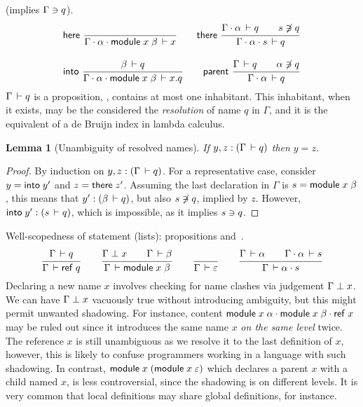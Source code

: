 \documentclass{article}
\theoremstyle{definition}
\theoremstyle{plain}
\newtheorem{lemma}{Lemma}
\theoremstyle{remark}
\begin{document}
 (implies $\Gamma\ni q$).
\begin{gather*}
  \nru{\rhere
     }{
     }{\Declares {\Gamma \sep \alpha \sep \mdef x \beta} x}
\qquad
   \nru{\rthere
      }{\Declares {\Gamma \sep \alpha} q \qquad \NotContains s q
      }{\Declares {\Gamma \sep \alpha \sep s} q}
\\[2ex]
  \nru{\rinto
     }{\Declares \beta q
     }{\Declares {\Gamma \sep \alpha \sep \mdef x \beta} {x.q}}
\qquad
   \nru{\rparent
      }{\Declares {\Gamma} q \qquad \NotContains \alpha q
      }{\Declares {\Gamma \sep \alpha} q}
\end{gather*}
$\Gamma\,\vdash q$ is a proposition, \ie, contains at most one
inhabitant.  This inhabitant, when it exists, may be the considered
the \emph{resolution} of name $q$ in $\Gamma$, and it is the
equivalent of a de Bruijn index in lambda calculus.
\begin{lemma}[Unambiguity of resolved names]
  If $y,z : (\Gamma\,\vdash q)$ then $y = z$.
\end{lemma}
\begin{proof}
  By induction on $y,z : (\Gamma\,\vdash q)$.
  For a representative case, consider
  $y = \mathsf{into}\;y'$ and $z = \mathsf{there}\;z'$.
  Assuming the last declaration in $\Gamma$ is $s = \mathsf{module}\;x\;\beta$,
  this means that $y' : (\beta\,\vdash q)$,
  but also $s\not\owns q$, implied by $z$.  However,
  $\mathsf{into}\;y' : (s\,\vdash q)$, which is impossible, as it implies
  $s\ni q$.
\end{proof}

Well-scopedness of statement (lists): propositions
  and
\fbox{$\WContent \Gamma \alpha$}\,.
\begin{gather*}
  \ru{\Declares \Gamma q}{\WContent \Gamma {\mref q}}
\qquad
  \ru{\NoClash \Gamma x \qquad \WContent \Gamma \beta
    }{\WContent \Gamma {\mdef x \beta}
    }
\qquad
  \ru{}{\WContent \Gamma \Ge}
\qquad
  \ru{\WContent \Gamma \alpha \qquad
      \WContent {\Gamma \sep \alpha} s
    }{\WContent \Gamma {\alpha \sep s}
    }
\end{gather*}
Declaring a new name $x$ involves checking for name clashes via judgement
$\Gamma \perp x$.  We can have $\Gamma \perp x$ vacuously true
without introducing ambiguity, but this might permit unwanted
shadowing.
For instance, content $\mathsf{module}\;x\;\alpha \cdot \mathsf{module}\;x\;\beta \cdot \mathsf{ref}\;x$ may be ruled out
since it introduces the same name $x$ \emph{on the same level} twice.
The reference $x$ is still unambiguous as we resolve it to the last
definition of $x$, however, this is likely to confuse programmers
working in a language with such shadowing.
In contrast, $\mathsf{module}\;x\;(\mathsf{module}\;x\;\varepsilon)$ which declares a
parent $x$ with a child named $x$, is less controversial, since the
shadowing is on different levels.  It is very common that local
definitions may share global definitions, for instance.
\end{document}
